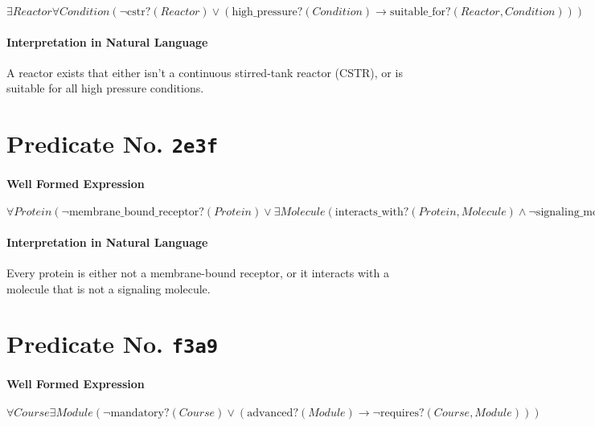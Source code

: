 \documentclass[11pt]{article}
\begin{document}
\(\exists \mathit{Reactor} \forall \mathit{Condition} (\neg \mathrm{cstr?}(\mathit{Reactor}) \lor (\mathrm{high\_pressure?}(\mathit{Condition}) \rightarrow \mathrm{suitable\_for?}(\mathit{Reactor}, \mathit{Condition})))\)

\paragraph*{Interpretation in Natural Language}
\label{sec:orga003956}

A reactor exists that either isn't a continuous stirred-tank reactor (CSTR), or is suitable for all high pressure conditions.



\section{Predicate No. \texttt{2e3f}}
\label{sec:org11e5193}

\paragraph*{Well Formed Expression}
\label{sec:org2d22ea2}

\(\forall \mathit{Protein} (\neg \mathrm{membrane\_bound\_receptor?}(\mathit{Protein}) \lor \exists \mathit{Molecule} (\mathrm{interacts\_with?}(\mathit{Protein}, \mathit{Molecule}) \land \neg \mathrm{signaling\_molecule?}(\mathit{Molecule})))\)

\paragraph*{Interpretation in Natural Language}
\label{sec:org792b0c9}

Every protein is either not a membrane-bound receptor, or it interacts with a molecule that is not a signaling molecule.



\section{Predicate No. \texttt{f3a9}}
\label{sec:orgeffe227}

\paragraph*{Well Formed Expression}
\label{sec:org17b47b3}

\(\forall \mathit{Course} \exists \mathit{Module} (\neg \mathrm{mandatory?}(\mathit{Course}) \lor (\mathrm{advanced?}(\mathit{Module}) \rightarrow \neg \mathrm{requires?}(\mathit{Course}, \mathit{Module})))\)
\end{document}
